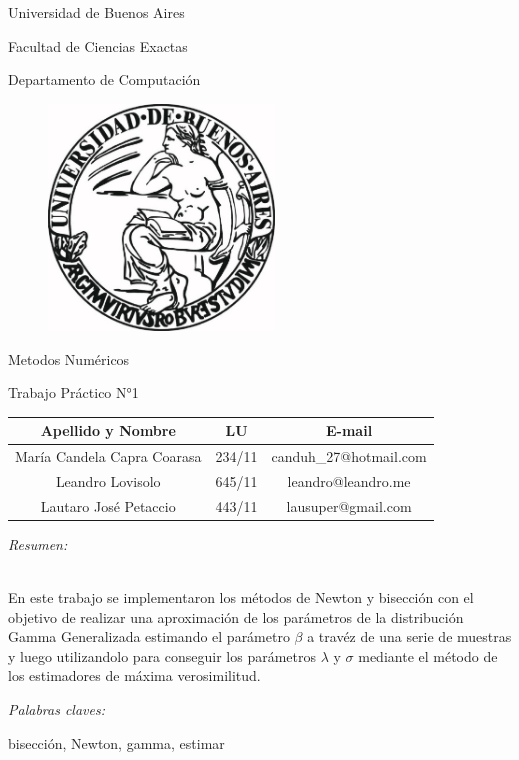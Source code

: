 \documentclass[a4paper,12pt]{article}
\begin{document}
	\begin{center}
	\begin{Huge} Universidad de Buenos Aires \\\end{Huge}
	\begin{LARGE}Facultad de Ciencias Exactas \\ \end{LARGE}
	\begin{Large}Departamento de Computaci\'on \\ \end{Large}
	\vspace*{1cm}
	\begin{figure}[ht!]
		\begin{center}
			\includegraphics[width=60mm]{UBA.jpg}
		\end{center}	
	\end{figure}
	\begin{Large}Metodos Num\'ericos \\ \end{Large}
	\begin{Large}Trabajo Pr\'actico N°1 \end{Large}
	
	\vspace*{1cm}	
	
	\begin{tabular}{|c|c|c|}
		\hline
		Apellido y Nombre & LU & E-mail\\
		\hline
		Mar\'ia Candela Capra Coarasa & 234/11 & canduh\_27@hotmail.com\\
		Leandro Lovisolo            & 645/11 & leandro@leandro.me\\
		Lautaro Jos\'e Petaccio       & 443/11 & lausuper@gmail.com\\
		\hline
	\end{tabular}
	\end{center}
	\begin{large} \em Resumen: \end{large} \\
En este trabajo se implementaron los m\'etodos de Newton y bisecci\'on con el objetivo de realizar una aproximaci\'on de los par\'ametros de la distribuci\'on Gamma Generalizada estimando el par\'ametro $\beta$ a trav\'ez de una serie de muestras y luego utilizandolo para conseguir los par\'ametros $\lambda$ y $\sigma$ mediante el m\'etodo de los estimadores de m\'axima verosimilitud. \\
	\begin{large} \em Palabras claves: \end{large} bisecci\'on, Newton, gamma, estimar
\end{document}
